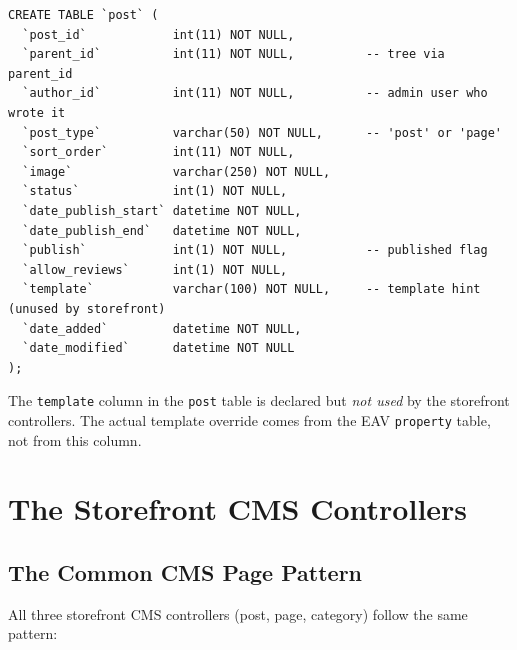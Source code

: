 \documentclass[11pt,a4paper]{article}
\begin{document}
\begin{lstlisting}[caption={The \texttt{post} table schema (shared by posts and pages).},label={lst:post-schema}]
CREATE TABLE `post` (
  `post_id`            int(11) NOT NULL,
  `parent_id`          int(11) NOT NULL,          -- tree via parent_id
  `author_id`          int(11) NOT NULL,          -- admin user who wrote it
  `post_type`          varchar(50) NOT NULL,      -- 'post' or 'page'
  `sort_order`         int(11) NOT NULL,
  `image`              varchar(250) NOT NULL,
  `status`             int(1) NOT NULL,
  `date_publish_start` datetime NOT NULL,
  `date_publish_end`   datetime NOT NULL,
  `publish`            int(1) NOT NULL,           -- published flag
  `allow_reviews`      int(1) NOT NULL,
  `template`           varchar(100) NOT NULL,     -- template hint (unused by storefront)
  `date_added`         datetime NOT NULL,
  `date_modified`      datetime NOT NULL
);
\end{lstlisting}

The \texttt{template} column in the \texttt{post} table is declared but
\emph{not used} by the storefront controllers. The actual template override
comes from the EAV \texttt{property} table, not from this column.

\section{The Storefront CMS Controllers}\label{sec:cms-controllers}

\subsection{The Common CMS Page Pattern}

All three storefront CMS controllers (post, page, category) follow the
same pattern:
\end{document}
